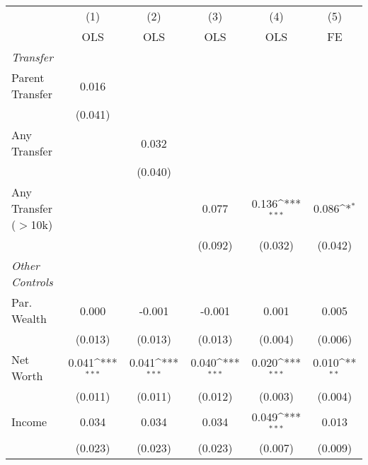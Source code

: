 {
\def\sym#1{\ifmmode^{#1}\else\(^{#1}\)\fi}
\begin{tabular}{l*{5}{c}}
\toprule
                &\multicolumn{1}{c}{(1)}&\multicolumn{1}{c}{(2)}&\multicolumn{1}{c}{(3)}&\multicolumn{1}{c}{(4)}&\multicolumn{1}{c}{(5)}\\
                &\multicolumn{1}{c}{OLS}&\multicolumn{1}{c}{OLS}&\multicolumn{1}{c}{OLS}&\multicolumn{1}{c}{OLS}&\multicolumn{1}{c}{FE}\\
\midrule
\textit{Transfer}&                  &                  &                  &                  &                  \\
\;Parent Transfer&    0.016         &                  &                  &                  &                  \\
                &  (0.041)         &                  &                  &                  &                  \\
\;Any Transfer  &                  &    0.032         &                  &                  &                  \\
                &                  &  (0.040)         &                  &                  &                  \\
\;Any Transfer ($>$10k)&                  &                  &    0.077         &    0.136\sym{***}&    0.086\sym{*}  \\
                &                  &                  &  (0.092)         &  (0.032)         &  (0.042)         \\
\textit{Other Controls}&                  &                  &                  &                  &                  \\
\;Par. Wealth   &    0.000         &   -0.001         &   -0.001         &    0.001         &    0.005         \\
                &  (0.013)         &  (0.013)         &  (0.013)         &  (0.004)         &  (0.006)         \\
\;Net Worth     &    0.041\sym{***}&    0.041\sym{***}&    0.040\sym{***}&    0.020\sym{***}&    0.010\sym{**} \\
                &  (0.011)         &  (0.011)         &  (0.012)         &  (0.003)         &  (0.004)         \\
\;Income        &    0.034         &    0.034         &    0.034         &    0.049\sym{***}&    0.013         \\
                &  (0.023)         &  (0.023)         &  (0.023)         &  (0.007)         &  (0.009)         \\

\end{tabular}}

